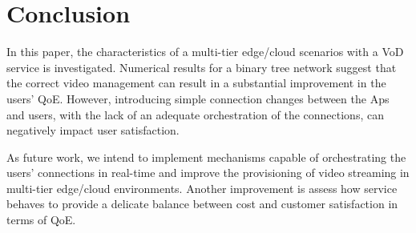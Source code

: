 \section{Conclusion}
\label{sec:conclusion}


In this paper, the characteristics of a multi-tier edge/cloud scenarios with a VoD service is investigated. Numerical results for a binary tree network suggest that the correct video management can result in a substantial improvement in the users' QoE. However, introducing simple connection changes between the Aps and users, with the lack of an adequate orchestration of the connections, can negatively impact user satisfaction.

As future work, we intend to implement mechanisms capable of orchestrating the users' connections in real-time and improve the provisioning of video streaming in multi-tier edge/cloud environments.
Another improvement is assess how service behaves to provide a delicate balance between cost and customer satisfaction in terms of QoE.

